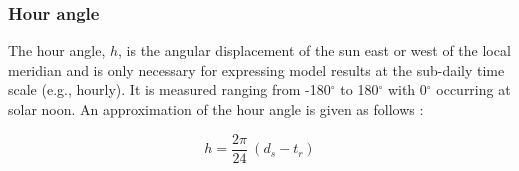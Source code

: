 \subsubsection{Hour angle}
\label{sec:hour}
The hour angle, $h$, is the angular displacement of the sun east or west of the local meridian and is only necessary for expressing model results at the sub-daily time scale (e.g., hourly). 
It is measured ranging from -180$^{\circ}$ to 180$^{\circ}$ with 0$^{\circ}$ occurring at solar noon. 
An approximation of the hour angle is given as follows \parencite{cooper69}:

\begin{equation}
\label{eq:houra}
    h = \frac{2\pi}{24} \: (d_{s} - t_r)
\end{equation}

